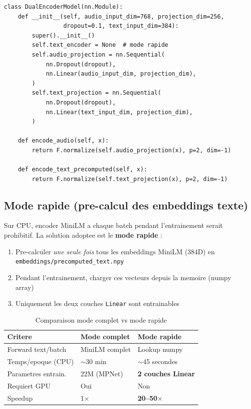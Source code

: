 \documentclass[12pt, a4paper]{article}
\begin{document}
\begin{lstlisting}[caption={DualEncoderModel simplifie (training/models.py)}]
class DualEncoderModel(nn.Module):
    def __init__(self, audio_input_dim=768, projection_dim=256,
                 dropout=0.1, text_input_dim=384):
        super().__init__()
        self.text_encoder = None  # mode rapide
        self.audio_projection = nn.Sequential(
            nn.Dropout(dropout),
            nn.Linear(audio_input_dim, projection_dim),
        )
        self.text_projection = nn.Sequential(
            nn.Dropout(dropout),
            nn.Linear(text_input_dim, projection_dim),
        )

    def encode_audio(self, x):
        return F.normalize(self.audio_projection(x), p=2, dim=-1)

    def encode_text_precomputed(self, x):
        return F.normalize(self.text_projection(x), p=2, dim=-1)
\end{lstlisting}

\subsection{Mode rapide (pre-calcul des embeddings texte)}

Sur CPU, encoder MiniLM a chaque batch pendant l'entrainement serait prohibitif.
La solution adoptee est le \textbf{mode rapide} :

\begin{enumerate}[leftmargin=1.5cm]
  \item Pre-calculer \textit{une seule fois} tous les embeddings MiniLM (384D) en
        \texttt{embeddings/precomputed\_text.npy}
  \item Pendant l'entrainement, charger ces vecteurs depuis la memoire (numpy array)
  \item Uniquement les deux couches \texttt{Linear} sont entrainables
\end{enumerate}

\begin{table}[H]
\centering
\caption{Comparaison mode complet vs mode rapide}
\begin{tabular}{lll}
\toprule
\textbf{Critere} & \textbf{Mode complet} & \textbf{Mode rapide} \\
\midrule
Forward text/batch & MiniLM complet & Lookup numpy \\
\rowcolor{silver}
Temps/epoque (CPU) & $\sim$30 min    & $\sim$45 secondes \\
Parametres entrain. & 22M (MPNet)   & \textbf{2 couches Linear} \\
\rowcolor{silver}
Requiert GPU       & Oui            & Non \\
Speedup            & 1$\times$      & \textbf{20--50$\times$} \\
\bottomrule
\end{tabular}
\end{table}
\end{document}
